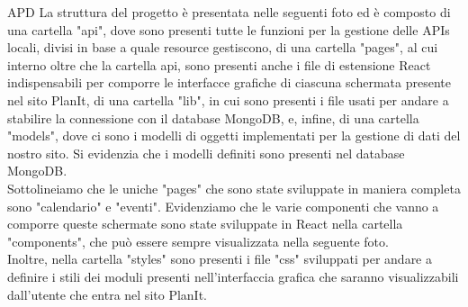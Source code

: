 \begin{listaPersonale} {APD}
    La struttura del progetto è presentata nelle seguenti foto ed è composto di una cartella "api", dove sono presenti tutte le funzioni per la gestione delle APIs locali, divisi in base a quale resource gestiscono, di una cartella "pages", al cui interno oltre che la cartella api, sono presenti anche i file di estensione React indispensabili per comporre le interfacce grafiche di ciascuna schermata presente nel sito PlanIt, di una cartella "lib", in cui sono presenti i file usati per andare a stabilire la connessione con il database MongoDB, e, infine, di una cartella "models", dove ci sono i modelli di oggetti implementati per la gestione di dati del nostro sito. Si evidenzia che i modelli definiti sono presenti nel database MongoDB.\\
    Sottolineiamo che le uniche "pages" che sono state sviluppate in maniera completa sono "calendario" e "eventi". Evidenziamo che le varie componenti che vanno a comporre queste schermate sono state sviluppate in React nella cartella "components", che può essere sempre visualizzata nella seguente foto.\\
    Inoltre, nella cartella "styles" sono presenti i file "css" sviluppati per andare a definire i stili dei moduli presenti nell'interfaccia grafica che saranno visualizzabili dall'utente che entra nel sito PlanIt.

\end{listaPersonale}
